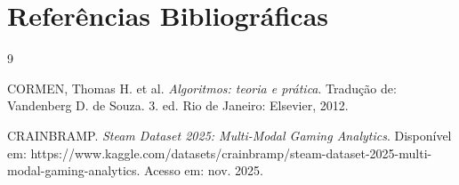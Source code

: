 \documentclass[11pt, a4paper]{article}
\begin{document}
\section{Referências Bibliográficas}

\renewcommand{\refname}{} %
\vspace{-1cm}
\begin{thebibliography}{9}

CORMEN, Thomas H. et al. \textit{Algoritmos: teoria e prática}. Tradução de: Vandenberg D. de Souza. 3. ed. Rio de Janeiro: Elsevier, 2012.

CRAINBRAMP. \textit{Steam Dataset 2025: Multi-Modal Gaming Analytics}. Disponível em: https://www.kaggle.com/datasets/crainbramp/steam-dataset-2025-multi-modal-gaming-analytics. Acesso em: nov. 2025.

\end{thebibliography}
\end{document}
